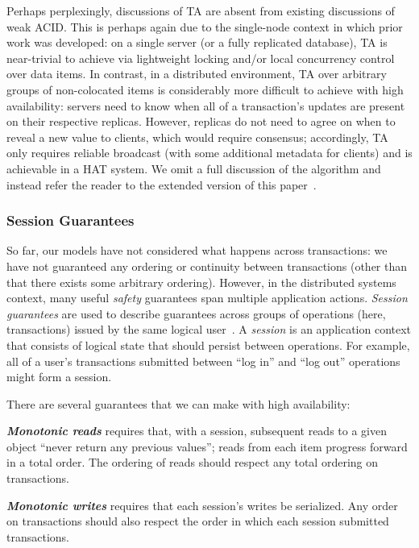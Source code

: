 Perhaps perplexingly, discussions of TA are absent from existing
discussions of weak ACID. This is perhaps again due to the single-node
context in which prior work was developed: on a single server (or a
fully replicated database), TA is near-trivial to achieve via
lightweight locking and/or local concurrency control over data
items. In contrast, in a distributed environment, TA over arbitrary
groups of non-colocated items is considerably more difficult to
achieve with high availability: servers need to know when all of a
transaction's updates are present on their respective
replicas. However, replicas do not need to agree on when to reveal a
new value to clients, which would require consensus; accordingly, TA
only requires reliable broadcast (with some additional metadata for
clients) and is achievable in a HAT system. We omit a full discussion
of the algorithm and instead refer the reader to the extended version
of this paper~\cite{hat-tr}.

\subsubsection{Session Guarantees}

So far, our models have not considered what happens across
transactions: we have not guaranteed any ordering or continuity
between transactions (other than that there exists some arbitrary
ordering). However, in the distributed systems context, many useful
\textit{safety} guarantees span multiple application actions.
\textit{Session guarantees} are used to describe guarantees across
groups of operations (here, transactions) issued by the same logical
user~\cite{sessionguarantees}. A \textit{session} is an application
context that consists of logical state that should persist between
operations. For example, all of a user's transactions submitted
between ``log in'' and ``log out'' operations might form a session.

There are several guarantees that we can make with high availability:

\vspace{.5em}\noindent\textit{\textbf{Monotonic reads}} requires that,
with a session, subsequent reads to a given object ``never return any
previous values''; reads from each item progress forward in a total
order. The ordering of reads should respect any total ordering on
transactions.

\vspace{.5em}\noindent\textit{\textbf{Monotonic writes}} requires that
each session's writes be serialized. Any order on transactions should
also respect the order in which each session submitted transactions.

